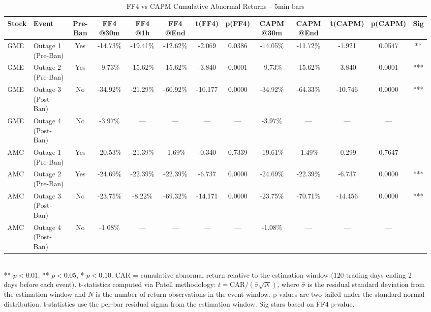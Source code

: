 \begin{table}[htbp]
  \centering
  \caption{FF4 vs CAPM Cumulative Abnormal Returns -- 5min bars}
  \label{tab:multifreq_5min}
  \begin{tabular}{llccccccccccc}
    \hline\hline
    Stock & Event & Pre-Ban & FF4 @30m & FF4 @1h & FF4 @End & t(FF4) & p(FF4) & CAPM @30m & CAPM @End & t(CAPM) & p(CAPM) & Sig \\
    \hline
    GME & Outage 1 (Pre-Ban) & Yes & -14.73\% & -19.41\% & -12.62\% & -2.069 & 0.0386 & -14.05\% & -11.72\% & -1.921 & 0.0547 & ** \\
    GME & Outage 2 (Pre-Ban) & Yes & -9.73\% & -15.62\% & -15.62\% & -3.840 & 0.0001 & -9.73\% & -15.62\% & -3.840 & 0.0001 & *** \\
    GME & Outage 3 (Post-Ban) & No & -34.92\% & -21.29\% & -60.92\% & -10.177 & 0.0000 & -34.92\% & -64.33\% & -10.746 & 0.0000 & *** \\
    GME & Outage 4 (Post-Ban) & No & -3.97\% & — & — & — & — & -3.97\% & — & — & — &  \\
    \hline
    AMC & Outage 1 (Pre-Ban) & Yes & -20.53\% & -21.39\% & -1.69\% & -0.340 & 0.7339 & -19.61\% & -1.49\% & -0.299 & 0.7647 &  \\
    AMC & Outage 2 (Pre-Ban) & Yes & -24.69\% & -22.39\% & -22.39\% & -6.737 & 0.0000 & -24.69\% & -22.39\% & -6.737 & 0.0000 & *** \\
    AMC & Outage 3 (Post-Ban) & No & -23.75\% & -8.22\% & -69.32\% & -14.171 & 0.0000 & -23.75\% & -70.71\% & -14.456 & 0.0000 & *** \\
    AMC & Outage 4 (Post-Ban) & No & -1.08\% & — & — & — & — & -1.08\% & — & — & — &  \\
    \hline\hline
  \end{tabular}
  \\[4pt]
  {\small *** $p<0.01$, ** $p<0.05$, * $p<0.10$. CAR = cumulative abnormal return relative to the estimation window (120 trading days ending 2 days before each event). t-statistics computed via Patell methodology: $t = \text{CAR} / (\hat{\sigma} \sqrt{N})$, where $\hat{\sigma}$ is the residual standard deviation from the estimation window and $N$ is the number of return observations in the event window. p-values are two-tailed under the standard normal distribution. t-statistics use the per-bar residual sigma from the estimation window. Sig stars based on FF4 p-value.}
\end{table}
